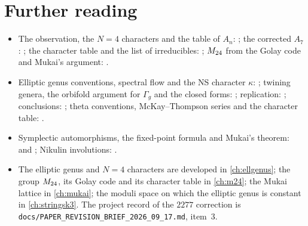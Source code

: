 \section*{Further reading}
\begin{itemize}[leftmargin=*]
\item The observation, the $N=4$ characters and the table of $A_n$:
  ; the corrected $A_7$: ;
  the character table and the list of irreducibles: ;
  $M_{24}$ from the Golay code and Mukai's argument: .
\item Elliptic genus conventions, spectral flow and the NS character $\kappa$:
  ; twining genera, the orbifold argument for $\Gamma_g$ and
  the closed forms: ; replication:
  ; conclusions: ; theta
  conventions, McKay--Thompson series and the character table:
  .
\item Symplectic automorphisms, the fixed-point formula and Mukai's theorem:
   and ;
  Nikulin involutions: .
\item The elliptic genus and $N=4$ characters are developed in \cref{ch:ellgenus}; the
  group $M_{24}$, its Golay code and its character table in \cref{ch:m24}; the Mukai lattice
  in \cref{ch:mukai}; the moduli space on which the elliptic genus is constant in
  \cref{ch:stringsk3}. The project record of the $2277$ correction is
  \texttt{docs/PAPER\_REVISION\_BRIEF\_2026\_09\_17.md}, item~3.
\end{itemize}
